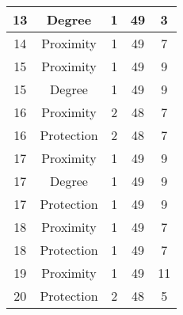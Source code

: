 \documentclass[results.tex]{subfiles}
\begin{document}
\begin{center}
\begin{tabular}{| c || c | c | c | c |}
            \hline
            13                      & Degree                       & 1                      & 49                      & 3                    \\
            \hline
            14                      & Proximity                    & 1                      & 49                      & 7                    \\
            \hline
            15                      & Proximity                    & 1                      & 49                      & 9                    \\
            \hline
            15                      & Degree                       & 1                      & 49                      & 9                    \\
            \hline
            16                      & Proximity                    & 2                      & 48                      & 7                    \\
            \hline
            16                      & Protection                   & 2                      & 48                      & 7                    \\
            \hline
            17                      & Proximity                    & 1                      & 49                      & 9                    \\
            \hline
            17                      & Degree                       & 1                      & 49                      & 9                    \\
            \hline
            17                      & Protection                   & 1                      & 49                      & 9                    \\
            \hline
            18                      & Proximity                    & 1                      & 49                      & 7                    \\
            \hline
            18                      & Protection                   & 1                      & 49                      & 7                    \\
            \hline
            19                      & Proximity                    & 1                      & 49                      & 11                   \\
            \hline
            20                      & Protection                   & 2                      & 48                      & 5                    \\

\end{tabular}
\end{center}
\end{document}
